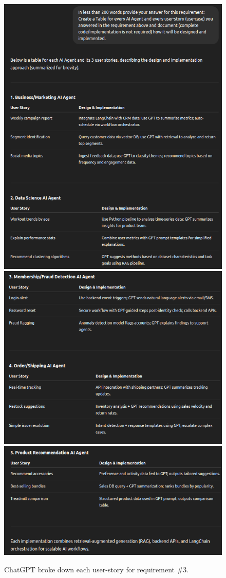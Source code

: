 \documentclass[11pt,letterpaper]{article}
\begin{document}
\begin{figure}[h!]
    \centering
      \includegraphics[width=0.5\linewidth]{chatgpt_04a.png}
      \includegraphics[width=0.5\linewidth]{chatgpt_04b.png}
      \includegraphics[width=0.5\linewidth]{chatgpt_04c.png}      
      \caption{ChatGPT broke down each user-story for requirement \#3.}
    \label{fig:req3}
\end{figure}

\clearpage
\end{document}
